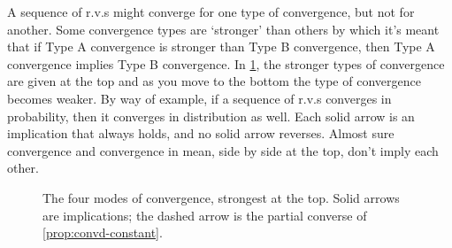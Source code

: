 A sequence of r.v.s might converge for one type of convergence, but not for another.
Some convergence types are `stronger' than others by which it's meant that if Type A convergence is stronger than Type B convergence, then Type A convergence implies Type B convergence.
In \cref{fig:hierarchy}, the stronger types of convergence are given at the top and as you move to the bottom the type of convergence becomes weaker.
By way of example, if a sequence of r.v.s converges in probability, then it converges in distribution as well.
Each solid arrow is an implication that always holds, and no solid arrow reverses.
Almost sure convergence and convergence in mean, side by side at the top, don't imply each other.

\begin{figure}[htbp]
\centering
{}
\caption{The four modes of convergence, strongest at the top. Solid arrows are implications; the dashed arrow is the partial converse of \cref{prop:convd-constant}.}
\label{fig:hierarchy}
\end{figure}

